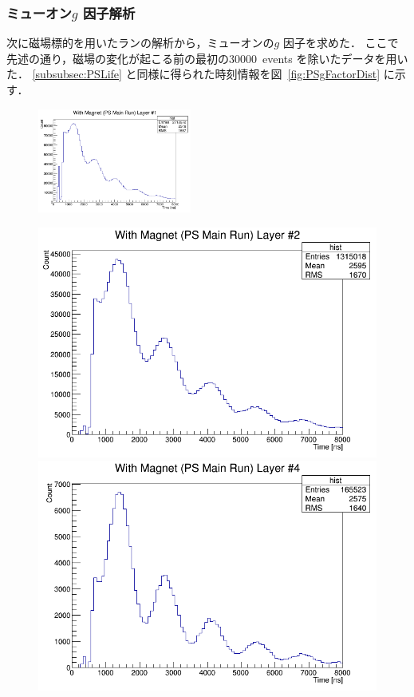 \subsubsection{ミューオン$g$ 因子解析}
\label{subsubsec:PSgFactor}
次に磁場標的を用いたランの解析から，ミューオンの$g$ 因子を求めた．
ここで先述の通り，磁場の変化が起こる前の最初の30000~events を除いたデータを用いた．
\ref{subsubsec:PSLife} と同様に得られた時刻情報を図~\ref{fig:PSgFactorDist} に示す．
\begin{figure}[h]
	\centering
	\includegraphics[width = 0.45\textwidth]{figure/odagawa/PSgFactorDist_Layer0.png}\\
	\begin{minipage}{0.45\textwidth}
	\centering
	\includegraphics[width = \textwidth]{figure/odagawa/PSgFactorDist_Layer1.png}
	\end{minipage}
	\begin{minipage}{0.45\textwidth}
	\centering
	\includegraphics[width = \textwidth]{figure/odagawa/PSgFactorDist_Layer3.png}

\end{minipage}
\end{figure}
